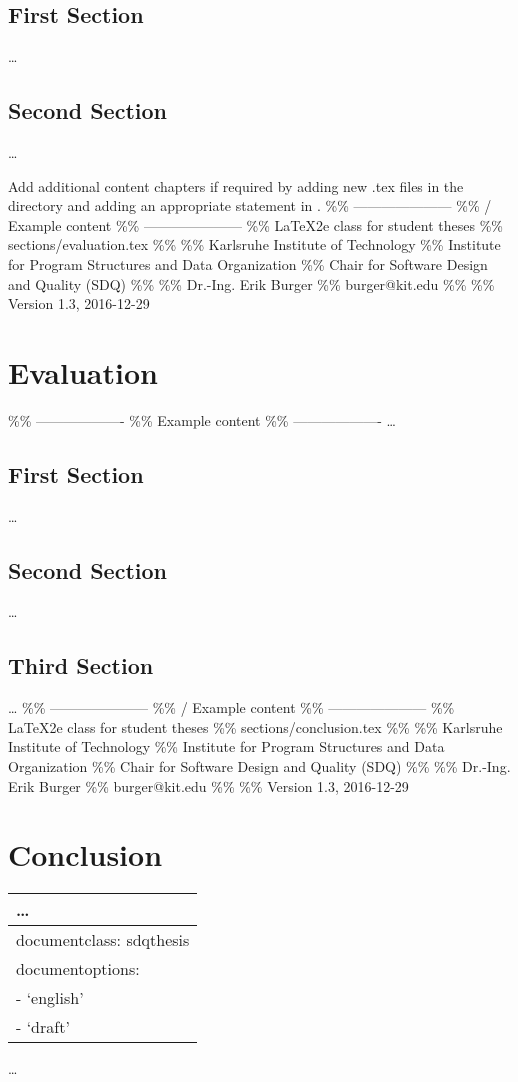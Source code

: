 \section{First Section}
\label{sec:SecondContent:FirstSection}

\dots

\section{Second Section}
\label{sec:SecondContent:SecondSection}

\dots

Add additional content chapters if required by adding new .tex files in
the  directory and adding an appropriate
 statement in . \%\%
--------------------- \%\% \textbar{} / Example content \textbar{} \%\%
--------------------- \%\% LaTeX2e class for student theses \%\%
sections/evaluation.tex \%\% \%\% Karlsruhe Institute of Technology \%\%
Institute for Program Structures and Data Organization \%\% Chair for
Software Design and Quality (SDQ) \%\% \%\% Dr.-Ing. Erik Burger \%\%
burger@kit.edu \%\% \%\% Version 1.3, 2016-12-29

\chapter{Evaluation}
\label{ch:Evaluation}

\%\% ------------------- \%\% \textbar{} Example content \textbar{} \%\%
------------------- \dots

\section{First Section}
\label{sec:Evaluation:FirstSection}

\dots

\section{Second Section}
\label{sec:Evaluation:SecondSection}

\dots

\section{Third Section}
\label{sec:Evaluation:ThirdSection}

\dots
\%\% --------------------- \%\% \textbar{} / Example content \textbar{}
\%\% --------------------- \%\% LaTeX2e class for student theses \%\%
sections/conclusion.tex \%\% \%\% Karlsruhe Institute of Technology \%\%
Institute for Program Structures and Data Organization \%\% Chair for
Software Design and Quality (SDQ) \%\% \%\% Dr.-Ing. Erik Burger \%\%
burger@kit.edu \%\% \%\% Version 1.3, 2016-12-29

\chapter{Conclusion}
\label{ch:Conclusion}

\begin{longtable}[]{@{}l@{}}
\toprule
\dots\tabularnewline
\midrule
\endhead
documentclass: sdqthesis\tabularnewline
documentoptions:\tabularnewline
- `english'\tabularnewline
- `draft'\tabularnewline
\bottomrule
\end{longtable}

\ldots{}

